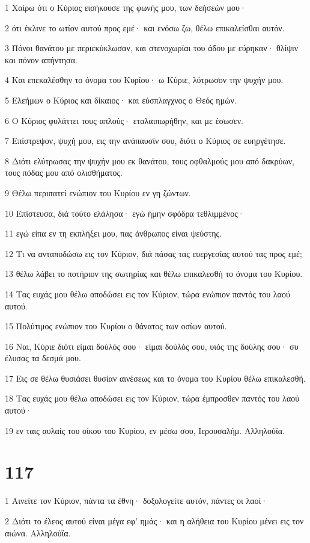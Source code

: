 \par 1 Χαίρω ότι ο Κύριος εισήκουσε της φωνής μου, των δεήσεών μου·
\par 2 ότι έκλινε το ωτίον αυτού προς εμέ· και ενόσω ζω, θέλω επικαλείσθαι αυτόν.
\par 3 Πόνοι θανάτου με περιεκύκλωσαν, και στενοχωρίαι του άδου με εύρηκαν· θλίψιν και πόνον απήντησα.
\par 4 Και επεκαλέσθην το όνομα του Κυρίου· ω Κύριε, λύτρωσον την ψυχήν μου.
\par 5 Ελεήμων ο Κύριος και δίκαιος· και εύσπλαγχνος ο Θεός ημών.
\par 6 Ο Κύριος φυλάττει τους απλούς· εταλαιπωρήθην, και με έσωσεν.
\par 7 Επίστρεψον, ψυχή μου, εις την ανάπαυσίν σου, διότι ο Κύριος σε ευηργέτησε.
\par 8 Διότι ελύτρωσας την ψυχήν μου εκ θανάτου, τους οφθαλμούς μου από δακρύων, τους πόδας μου από ολισθήματος.
\par 9 Θέλω περιπατεί ενώπιον του Κυρίου εν γη ζώντων.
\par 10 Επίστευσα, διά τούτο ελάλησα· εγώ ήμην σφόδρα τεθλιμμένος·
\par 11 εγώ είπα εν τη εκπλήξει μου, πας άνθρωπος είναι ψεύστης.
\par 12 Τι να ανταποδώσω εις τον Κύριον, διά πάσας τας ευεργεσίας αυτού τας προς εμέ;
\par 13 θέλω λάβει το ποτήριον της σωτηρίας και θέλω επικαλεσθή το όνομα του Κυρίου.
\par 14 Τας ευχάς μου θέλω αποδώσει εις τον Κύριον, τώρα ενώπιον παντός του λαού αυτού.
\par 15 Πολύτιμος ενώπιον του Κυρίου ο θάνατος των οσίων αυτού.
\par 16 Ναι, Κύριε διότι είμαι δούλός σου· είμαι δούλός σου, υιός της δούλης σου· συ έλυσας τα δεσμά μου.
\par 17 Εις σε θέλω θυσιάσει θυσίαν αινέσεως και το όνομα του Κυρίου θέλω επικαλεσθή.
\par 18 Τας ευχάς μου θέλω αποδώσει εις τον Κύριον, τώρα έμπροσθεν παντός του λαού αυτού·
\par 19 εν ταις αυλαίς του οίκου του Κυρίου, εν μέσω σου, Ιερουσαλήμ. Αλληλούϊα.

\chapter{117}

\par 1 Αινείτε τον Κύριον, πάντα τα έθνη· δοξολογείτε αυτόν, πάντες οι λαοί·
\par 2 Διότι το έλεος αυτού είναι μέγα εφ' ημάς· και η αλήθεια του Κυρίου μένει εις τον αιώνα. Αλληλούϊα.

